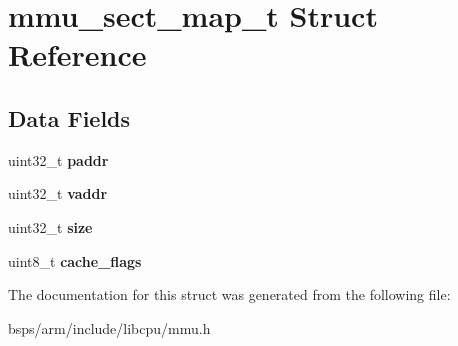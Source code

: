 \hypertarget{structmmu__sect__map__t}{}\section{mmu\+\_\+sect\+\_\+map\+\_\+t Struct Reference}
\label{structmmu__sect__map__t}
\subsection*{Data Fields}
\begin{DoxyCompactItemize}
\item 
\mbox{\label{structmmu__sect__map__t_a8d65ae5eb03004447d8a2a4a89310194}} 
uint32\+\_\+t {\bfseries paddr}
\item 
\mbox{\label{structmmu__sect__map__t_ab88c50ef1091773983dc82cc1444f7fa}} 
uint32\+\_\+t {\bfseries vaddr}
\item 
\mbox{\label{structmmu__sect__map__t_acab8be653aefd04706fbb2e163e24819}} 
uint32\+\_\+t {\bfseries size}
\item 
\mbox{\label{structmmu__sect__map__t_a50c45ef33b582aa7a744bf592b012e36}} 
uint8\+\_\+t {\bfseries cache\+\_\+flags}
\end{DoxyCompactItemize}


The documentation for this struct was generated from the following file\+:\begin{DoxyCompactItemize}
\item 
bsps/arm/include/libcpu/mmu.\+h\end{DoxyCompactItemize}
